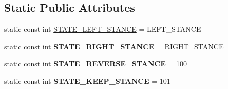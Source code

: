 \subsection*{Static Public Attributes}
\begin{DoxyCompactItemize}
\item 
static const int \hyperlink{classCartWheel_1_1Core_1_1SimBiConState_a3a418833302a944716944bb5fcab624f}{STATE\_\-LEFT\_\-STANCE} = LEFT\_\-STANCE
\item 
\hypertarget{classCartWheel_1_1Core_1_1SimBiConState_abdf40a8c96597ea842cdcab474fcb228}{
static const int {\bfseries STATE\_\-RIGHT\_\-STANCE} = RIGHT\_\-STANCE}
\label{classCartWheel_1_1Core_1_1SimBiConState_abdf40a8c96597ea842cdcab474fcb228}

\item 
\hypertarget{classCartWheel_1_1Core_1_1SimBiConState_a53fd8115dc1bcdce9975d40fdd086ddc}{
static const int {\bfseries STATE\_\-REVERSE\_\-STANCE} = 100}
\label{classCartWheel_1_1Core_1_1SimBiConState_a53fd8115dc1bcdce9975d40fdd086ddc}

\item 
\hypertarget{classCartWheel_1_1Core_1_1SimBiConState_a2e680b9caff699e007a102fa41f083a5}{
static const int {\bfseries STATE\_\-KEEP\_\-STANCE} = 101}
\label{classCartWheel_1_1Core_1_1SimBiConState_a2e680b9caff699e007a102fa41f083a5}

\end{DoxyCompactItemize}

